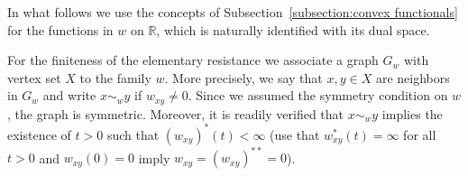 \documentclass[a4paper,11pt,reqno]{amsart}
\theoremstyle{definition}
\numberwithin{equation}{section}
\newcommand{\R}{{\mathbb R}}
\newcommand{\1}{\mathds{1}}
\begin{document}
 
 

In what follows we use the concepts of Subsection~\ref{subsection:convex functionals}   for the functions in $w$ on $\R$, which is naturally identified with its dual space.   

For the finiteness of the elementary resistance we associate a  graph $G_w$ with vertex set $X$ to the family $w$. More precisely, we say that $x,y \in X$ are  neighbors in $G_w$ and write $x \sim_w y$ if $w_{xy} \neq 0$. Since we assumed the symmetry condition on $w$, the graph is symmetric.  Moreover, it is readily verified that $x \sim_w y$ implies the existence of $t > 0$ such that  $(w_{xy})^*(t) < \infty$ (use that  $w_{xy}^*(t) = \infty$ for all $t > 0$ and $w_{xy}(0) = 0$ imply $w_{xy} = (w_{xy})^{**} = 0$). 
\end{document}

